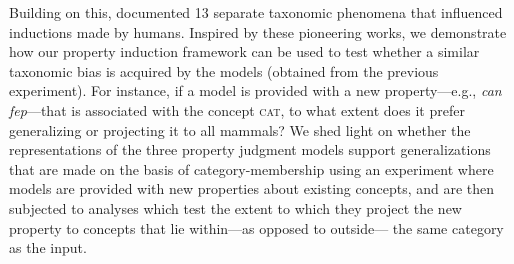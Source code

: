 \documentclass[10pt,letterpaper]{article}
\begin{document}
Building on this, \citet{osherson1990category} documented 13 separate taxonomic phenomena that influenced inductions made by humans.
Inspired by these pioneering works, we demonstrate how our property induction framework can be used to test whether a similar taxonomic bias is acquired by the models (obtained from the previous experiment). 
For instance, if a model is provided with a new property---e.g., \textit{can fep}---that is associated with the concept \textsc{cat}, to what extent does it prefer generalizing or projecting it to all mammals?
We shed light on whether the representations of the three property judgment models support generalizations that are made on the basis of category-membership using an experiment where models are provided with new properties about existing concepts, and are then subjected to analyses which test the extent to which they project the new property to concepts that lie within---as opposed to outside--- the same category as the input.
\end{document}
